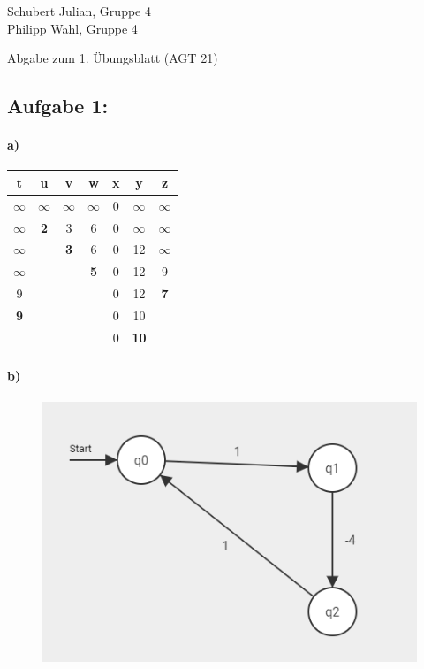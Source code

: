 \documentclass[a4paper]{article}
\begin{document}
\begin{small}
	\noindent
	Schubert Julian, Gruppe 4 \\
	Philipp Wahl, Gruppe 4
\end{small}
\bigskip

\begin{center}
	\LARGE Abgabe zum 1. Übungsblatt (AGT 21)
\end{center}
\smallskip

\subsection*{Aufgabe 1:}

\paragraph{a)}
\begin{tabular}{ |c | c | c | c | c | c | c |}
    \hline
    \textbf{t}  & \textbf{u}& \textbf{v}& \textbf{w}& \textbf{x}& \textbf{y}& \textbf{z} \\
    \hline
    $\infty$    & $\infty$  & $\infty$  & $\infty$  & 0         & $\infty$  & $\infty$ \\
    $\infty$    & \textbf{2}& 3         & 6         & 0         & $\infty$  & $\infty$ \\
    $\infty$    &           &\textbf{3} & 6         & 0         & 12        & $\infty$ \\
    $\infty$    &           &           & \textbf{5}& 0         & 12        & 9 \\
    9           &           &           &           & 0         & 12        &\textbf{7} \\
    \textbf{9}  &           &           &           & 0         & 10        & \\
                &           &           &           & 0         & \textbf{10}& \\
    \hline
\end{tabular}
\paragraph{b)}

\begin{figure}[htb]
\centering
\includegraphics[width=0.9\linewidth]{01.png}
\label{fig:name}
\end{figure}
\end{document}
